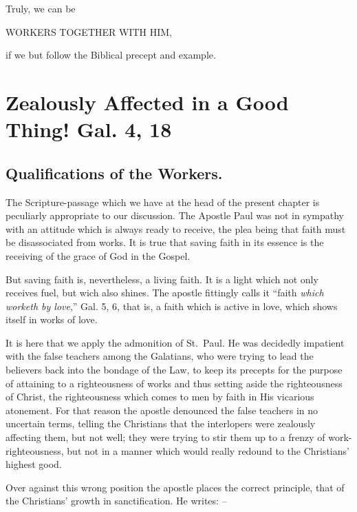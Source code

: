 \documentclass[
]{book}
\begin{document}
Truly, we can be

\begin{center} WORKERS TOGETHER WITH HIM, \end{center}

if we but follow the Biblical precept and example.

\hypertarget{zealously-affected-in-a-good-thing-gal.-4-18}{%
\chapter{Zealously Affected in a Good Thing! Gal. 4, 18}\label{zealously-affected-in-a-good-thing-gal.-4-18}}

\hypertarget{qualifications-of-the-workers.}{%
\section*{Qualifications of the Workers.}\label{qualifications-of-the-workers.}}

The Scripture-passage which we have at the head of the present chapter is peculiarly appropriate to our discussion. The Apostle Paul was not in sympathy with an attitude which is always ready to receive, the plea being that faith must be disassociated from works. It is true that saving faith in its essence is the receiving of the grace of God in the Gospel.

But saving faith is, nevertheless, a living faith. It is a light which not only receives fuel, but wich also shines. The apostle fittingly calls it ``faith \emph{which worketh by love},'' Gal. 5, 6, that is, a faith which is active in love, which shows itself in works of love.

It is here that we apply the admonition of St.~Paul. He was decidedly impatient with the false teachers among the Galatians, who were trying to lead the believers back into the bondage of the Law, to keep its precepts for the purpose of attaining to a righteousness of works and thus setting aside the righteousness of Christ, the righteousness which comes to men by faith in His vicarious atonement. For that reason the apostle denounced the false teachers in no uncertain terms, telling the Christians that the interlopers were zealously affecting them, but not well; they were trying to stir them up to a frenzy of work-righteousness, but not in a manner which would really redound to the Christians' highest good.

Over against this wrong position the apostle places the correct principle, that of the Christians' growth in sanctification. He writes: --
\end{document}
